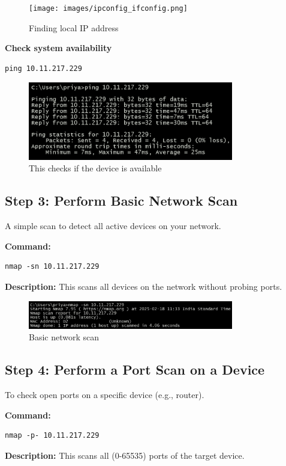 \documentclass{article}
\begin{document}
\begin{figure}[h]
    \centering
    \texttt{[image: images/ipconfig\_ifconfig.png]}
    \caption{Finding local IP address}
\end{figure}

\textbf{Check system availability}
\begin{lstlisting}
ping 10.11.217.229
\end{lstlisting}

\begin{figure}[h]
    \centering
    \includegraphics[width=0.8\textwidth]{images/ping.png}
    \caption{This checks if the device is available}
\end{figure}

\subsection{Step 3: Perform Basic Network Scan}
A simple scan to detect all active devices on your network.

\textbf{Command:}
\begin{lstlisting}
nmap -sn 10.11.217.229
\end{lstlisting}
\textbf{Description:} This scans all devices on the network without probing ports.

\begin{figure}[h]
    \centering
    \includegraphics[width=0.8\textwidth]{images/nmap_scan.jpg} 
    \caption{Basic network scan}
\end{figure}

\subsection{Step 4: Perform a Port Scan on a Device}
To check open ports on a specific device (e.g., router).

\textbf{Command:}
\begin{lstlisting}
nmap -p- 10.11.217.229
\end{lstlisting}
\textbf{Description:} This scans all (0-65535) ports of the target device.
\end{document}

